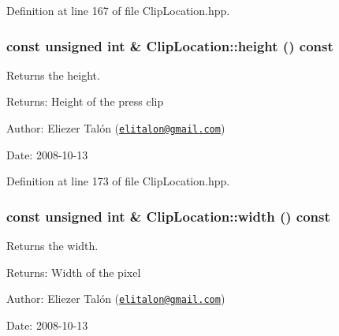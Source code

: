 Definition at line 167 of file ClipLocation.hpp.\hypertarget{class_clip_location_e18ec2c31e76a983acdbaec9d3bad659}{
\subsubsection[height]{\setlength{\rightskip}{0pt plus 5cm}const unsigned int \& ClipLocation::height () const}}
\label{class_clip_location_e18ec2c31e76a983acdbaec9d3bad659}


Returns the height. 

\begin{Desc}
\item[Returns:]Height of the press clip\end{Desc}
\begin{Desc}
\item[Author:]Eliezer Talón (\href{mailto:elitalon@gmail.com}{\tt elitalon@gmail.com}) \end{Desc}
\begin{Desc}
\item[Date:]2008-10-13 \end{Desc}


Definition at line 173 of file ClipLocation.hpp.\hypertarget{class_clip_location_e48a4531c0473ec63dbc992e866a50e7}{
\subsubsection[width]{\setlength{\rightskip}{0pt plus 5cm}const unsigned int \& ClipLocation::width () const}}
\label{class_clip_location_e48a4531c0473ec63dbc992e866a50e7}


Returns the width. 

\begin{Desc}
\item[Returns:]Width of the pixel\end{Desc}
\begin{Desc}
\item[Author:]Eliezer Talón (\href{mailto:elitalon@gmail.com}{\tt elitalon@gmail.com}) \end{Desc}
\begin{Desc}
\item[Date:]2008-10-13 \end{Desc}


